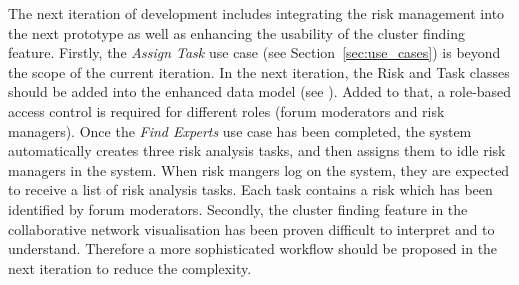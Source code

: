 The next iteration of development includes integrating the risk management into the next prototype as well as enhancing the usability of the cluster finding feature.
Firstly, the \emph{Assign Task} use case (see Section~\ref{sec:use_cases}) is beyond the scope of the current iteration. In the next iteration, the Risk and Task classes should be added into the enhanced data model (see ). Added to that, a role-based access control is required for different roles (forum moderators and risk managers). Once the \emph{Find Experts} use case has been completed, the system automatically creates three risk analysis tasks, and then assigns them to idle risk managers in the system. When risk mangers log on the system, they are expected to receive a list of risk analysis tasks. Each task contains a risk which has been identified by forum moderators.  
Secondly, the cluster finding feature in the collaborative network visualisation has been proven difficult to interpret and to understand. Therefore a more sophisticated workflow should be proposed in the next iteration to reduce the complexity.
